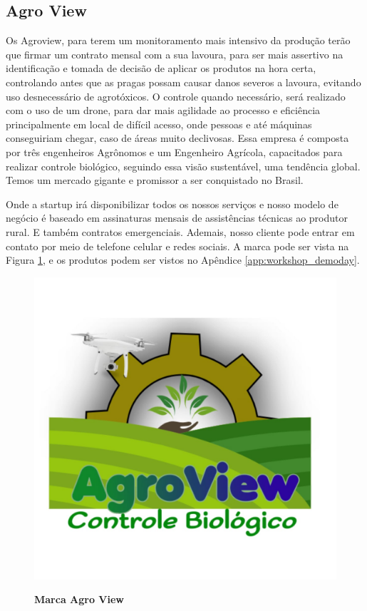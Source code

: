 \subsection{Agro View}


Os Agroview, para terem um monitoramento mais intensivo da produção terão que firmar um contrato mensal com a sua lavoura, para ser mais assertivo na identificação e tomada de decisão de aplicar os produtos na hora certa, controlando antes que as pragas possam causar danos severos a lavoura, evitando uso desnecessário de agrotóxicos. O controle quando necessário, será realizado com o uso de um drone, para dar mais agilidade ao processo e eficiência principalmente em local de difícil acesso, onde pessoas e até máquinas conseguiriam chegar, caso de áreas muito declivosas. Essa empresa é composta por três engenheiros Agrônomos e um Engenheiro Agrícola, capacitados para realizar controle biológico, seguindo essa visão sustentável, uma tendência global. Temos um mercado gigante e promissor a ser conquistado no Brasil.

Onde a startup irá disponibilizar todos os nossos serviços e nosso modelo de negócio é baseado em assinaturas mensais de assistências técnicas ao produtor rural. E também contratos emergenciais. Ademais, nosso cliente pode entrar em contato por meio de telefone celular e redes sociais. A marca pode ser vista na Figura \ref{figura_19}, e os produtos podem ser vistos no Apêndice \ref{app:workshop_demoday}.


\begin{figure}[!htb]
\centering
\caption{\textbf{Marca Agro View}}
\includegraphics[scale=0.2]{Imagens/agroview.jpg}
\label{figura_19}
\end{figure}

